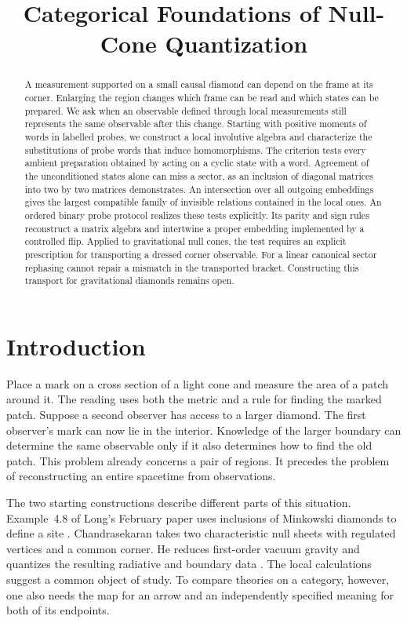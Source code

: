 \documentclass[11pt,letterpaper]{article}
\title{Categorical Foundations of Null-Cone Quantization\series{Part I}}
\begin{document}
\maketitle
\begin{abstract}
A measurement supported on a small causal diamond can depend on the frame at its corner. Enlarging the region changes which frame can be read and which states can be prepared. We ask when an observable defined through local measurements still represents the same observable after this change. Starting with positive moments of words in labelled probes, we construct a local involutive algebra and characterize the substitutions of probe words that induce homomorphisms. The criterion tests every ambient preparation obtained by acting on a cyclic state with a word. Agreement of the unconditioned states alone can miss a sector, as an inclusion of diagonal matrices into two by two matrices demonstrates. An intersection over all outgoing embeddings gives the largest compatible family of invisible relations contained in the local ones. An ordered binary probe protocol realizes these tests explicitly. Its parity and sign rules reconstruct a matrix algebra and intertwine a proper embedding implemented by a controlled flip. Applied to gravitational null cones, the test requires an explicit prescription for transporting a dressed corner observable. For a linear canonical sector rephasing cannot repair a mismatch in the transported bracket. Constructing this transport for gravitational diamonds remains open.
\end{abstract}

\section{Introduction}

Place a mark on a cross section of a light cone and measure the area of a patch around it. The reading uses both the metric and a rule for finding the marked patch. Suppose a second observer has access to a larger diamond. The first observer's mark can now lie in the interior. Knowledge of the larger boundary can determine the same observable only if it also determines how to find the old patch. This problem already concerns a pair of regions. It precedes the problem of reconstructing an entire spacetime from observations.

The two starting constructions describe different parts of this situation. Example~4.8 of Long's February paper uses inclusions of Minkowski diamonds to define a site \cite{long}. Chandrasekaran takes two characteristic null sheets with regulated vertices and a common corner. He reduces first-order vacuum gravity and quantizes the resulting radiative and boundary data \cite[Secs.~3--4]{nc}. The local calculations suggest a common object of study. To compare theories on a category, however, one also needs the map for an arrow and an independently specified meaning for both of its endpoints.
\end{document}

